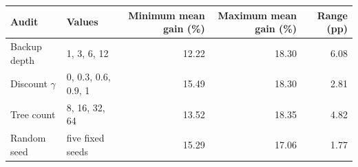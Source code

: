 \begin{tabular}{llrrr}
\toprule
Audit & Values & Minimum mean gain (\%) & Maximum mean gain (\%) & Range (pp) \\
\midrule
Backup depth & 1, 3, 6, 12 & 12.22 & 18.30 & 6.08 \\ 
Discount $\gamma$ & 0, 0.3, 0.6, 0.9, 1 & 15.49 & 18.30 & 2.81 \\ 
Tree count & 8, 16, 32, 64 & 13.52 & 18.35 & 4.82 \\ 
Random seed & five fixed seeds & 15.29 & 17.06 & 1.77 \\ 
\bottomrule
\end{tabular}
